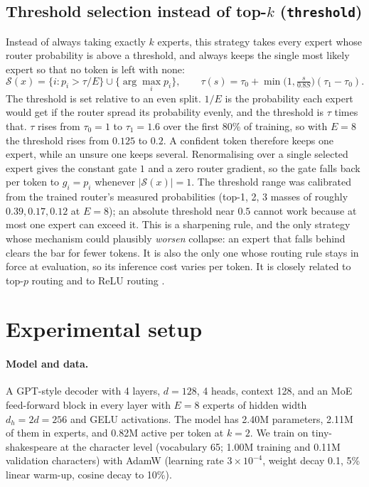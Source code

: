 \documentclass[10pt]{article}
\theoremstyle{definition}
\theoremstyle{remark}
\newcommand{\code}[1]{\texttt{#1}}
\begin{document}
\subsection{Threshold selection instead of top-$k$ (\code{threshold})}
\label{sec:threshold}
Instead of always taking exactly $k$ experts, this strategy takes every expert whose router probability is above a threshold, and always keeps the single most likely expert so that no token is left with none:
\begin{equation}
\mathcal{S}(x)=\bigl\{i:p_i>\tau/E\bigr\}\cup\{\arg\max_i p_i\},\qquad \tau(s)=\tau_0+\min\!\bigl(1,\tfrac{s}{0.8S}\bigr)(\tau_1-\tau_0).
\end{equation}
The threshold is set relative to an even split. $1/E$ is the probability each expert would get if the router spread its probability evenly, and the threshold is $\tau$ times that. $\tau$ rises from $\tau_0=1$ to $\tau_1=1.6$ over the first 80\% of training, so with $E=8$ the threshold rises from $0.125$ to $0.2$. A confident token therefore keeps one expert, while an unsure one keeps several.
Renormalising over a single selected expert gives the constant gate $1$ and a zero router gradient, so the gate falls back per token to $g_i=p_i$ whenever $|\mathcal{S}(x)|=1$. The threshold range was calibrated from the trained router's measured probabilities (top-1, 2, 3 masses of roughly $0.39, 0.17, 0.12$ at $E=8$); an absolute threshold near $0.5$ cannot work because at most one expert can exceed it. This is a sharpening rule, and the only strategy whose mechanism could plausibly \emph{worsen} collapse: an expert that falls behind clears the bar for fewer tokens. It is also the only one whose routing rule stays in force at evaluation, so its inference cost varies per token. It is closely related to top-$p$ routing \citep{huang2024harder} and to ReLU routing \citep{wang2025remoe}.

\section{Experimental setup}
\label{sec:setup}

\paragraph{Model and data.}
A GPT-style decoder \citep{radford2019language} with 4 layers, $d=128$, 4 heads, context 128, and an MoE feed-forward block in every layer with $E=8$ experts of hidden width $d_h=2d=256$ and GELU activations. The model has 2.40M parameters, 2.11M of them in experts, and 0.82M active per token at $k=2$. We train on tiny-shakespeare \citep{karpathy2015charrnn} at the character level (vocabulary 65; 1.00M training and 0.11M validation characters) with AdamW \citep{loshchilov2019decoupled} (learning rate $3\times10^{-4}$, weight decay 0.1, 5\% linear warm-up, cosine decay to 10\%).
\end{document}
